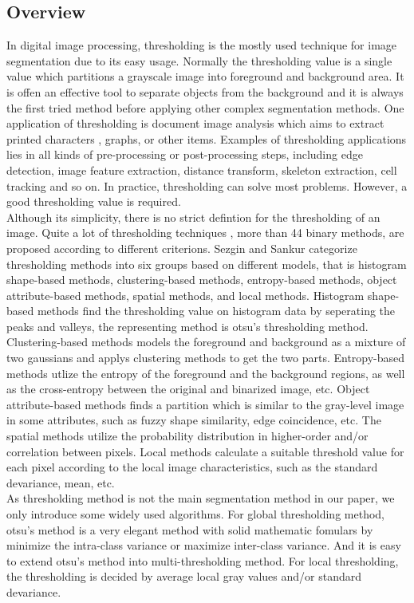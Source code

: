\subsection{Overview}
In digital image processing, thresholding is the mostly used technique for image segmentation due to its easy usage. Normally the thresholding value is a single value which partitions a grayscale image into foreground and background area. It is offen an effective tool to separate objects from the background and it is always the first tried method before applying other complex segmentation methods. One application of thresholding is document image analysis which aims to extract printed characters \cite{kamel1993extraction,abak1997performance}, graphs, or other items. Examples of thresholding applications lies in all kinds of pre-processing or post-processing steps, including edge detection, image feature extraction, distance transform, skeleton extraction, cell tracking and so on. In practice, thresholding can solve most problems. However, a good thresholding value is required.\\ 
Although its simplicity, there is no strict defintion for the thresholding of an image. Quite a lot of thresholding techniques \cite{sahoo1988survey, sankur2001image, sezgin2004survey}, more than 44 binary methods, are proposed according to different criterions. Sezgin and Sankur \cite{sankur2001image, sezgin2004survey} categorize thresholding methods into six groups based on different models, that is histogram shape-based methods, clustering-based methods, entropy-based methods, object attribute-based methods, spatial methods, and local methods. Histogram shape-based methods find the thresholding value on histogram data by seperating the peaks and valleys, the representing method is otsu's thresholding method. Clustering-based methods models the foreground and background as a mixture of two gaussians and applys clustering methods to get the two parts. Entropy-based methods utlize the entropy of the foreground and the background regions, as well as the cross-entropy between the original and binarized image, etc. Object attribute-based methods finds a partition which is similar to the gray-level image in some attributes, such as fuzzy shape similarity, edge coincidence, etc. The spatial methods utilize the probability distribution in higher-order and/or correlation between pixels. Local methods calculate a suitable threshold value for each pixel according to the local image characteristics, such as the standard devariance, mean, etc.\\
As thresholding method is not the main segmentation method in our paper, we only introduce some widely used algorithms. For global thresholding method, otsu's method \cite{otsu1975threshold} is a very elegant method with solid mathematic fomulars by minimize the intra-class variance or maximize inter-class variance. And it is easy to extend otsu's method into multi-thresholding method. For local thresholding, the thresholding is decided by average local gray values and/or standard devariance. 
